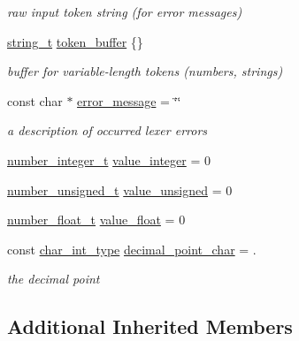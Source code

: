\begin{DoxyCompactItemize}
\begin{DoxyCompactList}\small\item\em raw input token string (for error messages) \end{DoxyCompactList}\item 
\hyperlink{classnlohmann_1_1detail_1_1lexer_af85c01fd669d529ab93a9e1d80b62015}{string\+\_\+t} \hyperlink{classnlohmann_1_1detail_1_1lexer_ac4eaf39567bd5f0750e5d7e913fb474d}{token\+\_\+buffer} \{\}
\begin{DoxyCompactList}\small\item\em buffer for variable-\/length tokens (numbers, strings) \end{DoxyCompactList}\item 
const char $\ast$ \hyperlink{classnlohmann_1_1detail_1_1lexer_a84cbcd8c897c98c2ce04d29a29bf84cc}{error\+\_\+message} = \char`\"{}\char`\"{}
\begin{DoxyCompactList}\small\item\em a description of occurred lexer errors \end{DoxyCompactList}\item 
\hyperlink{classnlohmann_1_1detail_1_1lexer_a594e61f96c87b4464beeab681111ac0c}{number\+\_\+integer\+\_\+t} \hyperlink{classnlohmann_1_1detail_1_1lexer_a5134de850fab8f41474a36ae07998088}{value\+\_\+integer} = 0
\item 
\hyperlink{classnlohmann_1_1detail_1_1lexer_af6b19ef34b2e9ee2321cfaf62ee066cb}{number\+\_\+unsigned\+\_\+t} \hyperlink{classnlohmann_1_1detail_1_1lexer_ae84cbf312215c15d79783380b1592f74}{value\+\_\+unsigned} = 0
\item 
\hyperlink{classnlohmann_1_1detail_1_1lexer_a438a78e53120fd2c3ea049161d4798cb}{number\+\_\+float\+\_\+t} \hyperlink{classnlohmann_1_1detail_1_1lexer_a0d74bb18ba7d32ea7e7c9d9a7d6c2e70}{value\+\_\+float} = 0
\item 
const \hyperlink{classnlohmann_1_1detail_1_1lexer_a46612a81a07dbbc6daef870ca4f959e4}{char\+\_\+int\+\_\+type} \hyperlink{classnlohmann_1_1detail_1_1lexer_a6f2fd5b4b6b153f11fc8f77213350073}{decimal\+\_\+point\+\_\+char} = \textquotesingle{}.\textquotesingle{}
\begin{DoxyCompactList}\small\item\em the decimal point \end{DoxyCompactList}\end{DoxyCompactItemize}
\subsection*{Additional Inherited Members}


